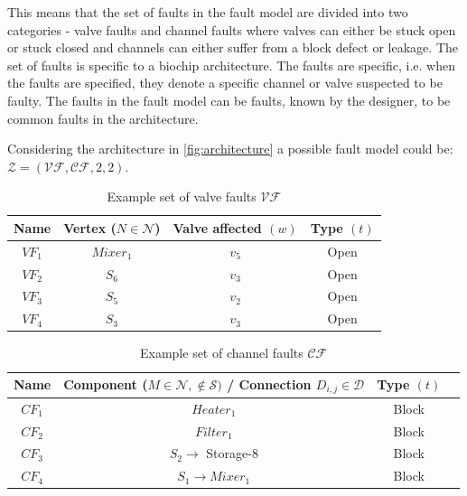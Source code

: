 This means that the set of faults in the fault model are divided into two categories - valve faults and channel faults where valves can either be stuck open or stuck closed and channels can either suffer from a block defect or leakage. The set of faults is specific to a biochip architecture. The faults are specific, i.e. when the faults are specified, they denote a specific channel or valve suspected to be faulty. The faults in the fault model can be faults, known by the designer, to be common faults in the architecture.

Considering the architecture in \autoref{fig:architecture} a possible fault model could be: $\mathcal{Z} = (\mathcal{VF}, \mathcal{CF}, 2, 2)$.

\begin{table}[H]
\centering
\caption{Example set of valve faults $\mathcal{VF}$}
\begin{tabular}{| c | c | c | c |}
\hline
\textbf{Name} & \textbf{Vertex} ($N \in \mathcal{N}$) & \textbf{Valve affected} $(w)$ & \textbf{Type} $(t)$ \\ \hline
$VF_1$ & $Mixer_1$ & $v_5$ & Open \\ \hline
$VF_2$ & $S_6$ & $v_3$ & Open \\ \hline
$VF_3$ & $S_5$ & $v_2$ & Open \\ \hline
$VF_4$ & $S_3$ & $v_3$ & Open \\ \hline
\end{tabular}
\label{tab:valve-faults}
\end{table}

\begin{table}[H]
\centering
\caption{Example set of channel faults $\mathcal{CF}$}
\begin{tabular}{| c | c | c | c |}
\hline
\textbf{Name} & \textbf{Component} ($M \in \mathcal{N}, \notin \mathcal{S})$ \textbf{/} \textbf{Connection} $D_{i, j} \in \mathcal{D}$ & \textbf{Type} $(t)$ \\ \hline
$CF_1$ & $Heater_1$ & Block \\ \hline
$CF_2$ & $Filter_1$ & Block \\ \hline
$CF_3$ & $S_2 \rightarrow$ Storage-8 & Block \\ \hline
$CF_4$ & $S_1 \rightarrow Mixer_1$ & Block \\ \hline
\end{tabular}
\label{tab:channel-faults}
\end{table}

